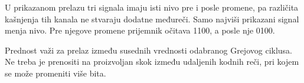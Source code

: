 U prikazanom prelazu tri signala imaju isti nivo pre i posle promene, pa različita kašnjenja tih kanala ne stvaraju dodatne međureči. Samo najviši prikazani signal menja nivo. Pre njegove promene prijemnik očitava 1100, a posle nje 0100.

Prednost važi za prelaz između susednih vrednosti odabranog Grejovog ciklusa. Ne treba je prenositi na proizvoljan skok između udaljenih kodnih reči, pri kojem se može promeniti više bita.
